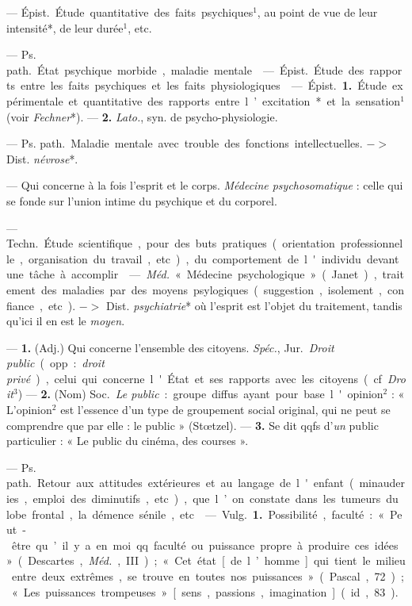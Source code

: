 \begin{itemize}[leftmargin=1cm, label=, itemsep=1pt]
 — \si{Épist.} Étude quantitative des faits psychiques$^1$,
au point de vue de leur intensité*, de leur durée$^1$, etc.

 — \si{Ps. path.} État psychique morbide, maladie mentale.

 — \si{Épist.} Étude
des rapports entre les faits psychiques et les faits physiologiques.

 — \si{Épist.} {\bf 1.} Étude expérimentale et
quantitative des rapports entre l’excitation* et la sensation$^1$ (voir {\it
Fechner}*). — {\bf 2.}
{\it Lato.}, syn. de psycho-physiologie.

 — \si{Ps. path.} Maladie mentale
avec trouble des fonctions intellectuelles. $->$ Dist. {\it névrose}*.

 — Qui concerne à la fois l'esprit et le corps. {\it
Médecine psychosomatique} : celle qui se fonde sur l’union intime du
psychique et du corporel.

 — \si{Techn.} Étude scientifique, pour des buts
pratiques (orientation professionnelle, organisation du travail, etc.), du
comportement de l'individu devant une tâche à accomplir.

 — \si{{\it Méd.}} « Médecine psychologique » (Janet),
traitement des maladies par des moyens psylogiques (suggestion, isolement,
confiance, etc). $->$ Dist. {\it psychiatrie}* où l'esprit est l’objet du
traitement, tandis qu'ici il en est le {\it moyen}.

 — {\bf 1.} (Adj.) Qui concerne l’ensemble des citoyens.
{\it Spéc.}, \si{Jur.} {\it Droit public} (opp. : {\it droit privé}), celui
qui concerne l'État et ses rapports avec les citoyens (cf. {\it Droit}$^3$)
— {\bf 2.} (Nom) \si{Soc.} {\it Le public} : groupe diffus ayant pour base
l'opinion$^2$ : « L'opinion$^2$ est l'essence d’un type de groupement social
original, qui ne peut se comprendre que par elle : le public » (Stœtzel). —
{\bf 3.} Se dit qqfs d'{\it un} public particulier : « Le public du cinéma,
des courses ».

 — \si{Ps. path.} Retour aux attitudes extérieures et au
langage de l'enfant (minauderies, emploi des diminutifs, etc.), que l’on
constate dans les tumeurs du lobe frontal, la démence sénile, etc.

 — \si{Vulg.} {\bf 1.} Possibilité,
faculté : « Peut-être qu’il y a en moi
qq. faculté ou puissance propre à produire ces idées » (Descartes,
{\it Méd.}, III) ; « Cet état [de l’homme] qui tient le milieu entre deux
extrêmes, se trouve en toutes nos puissances » (Pascal, 72) ; « Les
puissances trompeuses » [sens, passions, imagination] (id., 83).


\end{itemize}
